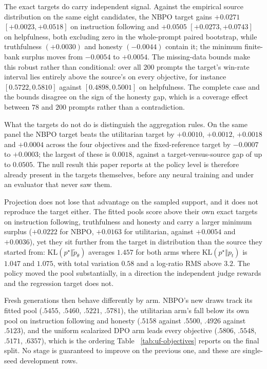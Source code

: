 \documentclass{article}
\makeatletter
\let\revieworiginalref\ref
\newcommand{\reviewref}[1]{%
  \@ifundefined{r@#1}{\textnormal{[original-draft ref.: \texttt{\detokenize{#1}}]}}%
  {\revieworiginalref{#1}}}
\let\ref\reviewref
\theoremstyle{remark}
\theoremstyle{plain}
\newcommand{\KL}{\mathrm{KL}}
\newcommand{\NBPO}{\textsc{NBPO}}
\makeatother
\begin{document}
The exact targets do carry independent signal. Against the empirical source distribution on the
same eight candidates, the \NBPO{} target gains $+0.0271$ $[+0.0023,+0.0518]$ on instruction
following and $+0.0505$ $[+0.0273,+0.0743]$ on helpfulness, both excluding zero in the
whole-prompt paired bootstrap, while truthfulness $(+0.0030)$ and honesty $(-0.0044)$ contain it;
the minimum finite-bank surplus moves from $-0.0054$ to $+0.0054$. The missing-data bounds make
this robust rather than conditional: over all $200$ prompts the target's win-rate interval lies
entirely above the source's on every objective, for instance $[0.5722,0.5810]$ against
$[0.4898,0.5001]$ on helpfulness. The complete case and the bounds disagree on the sign of the
honesty gap, which is a coverage effect between $78$ and $200$ prompts rather than a contradiction.

What the targets do not do is distinguish the aggregation rules. On the same panel the \NBPO{}
target beats the utilitarian target by $+0.0010$, $+0.0012$, $+0.0018$ and $+0.0004$ across the
four objectives and the fixed-reference target by $-0.0007$ to $+0.0003$; the largest of these is
$0.0018$, against a target-versus-source gap of up to $0.0505$. The null result this paper reports
at the policy level is therefore already present in the targets themselves, before any neural
training and under an evaluator that never saw them.

Projection does not lose that advantage on the sampled support, and it does not reproduce the
target either. The fitted pools score above their own exact targets on instruction following,
truthfulness and honesty and carry a larger minimum surplus ($+0.0222$ for \NBPO{}, $+0.0163$ for
utilitarian, against $+0.0054$ and $+0.0036$), yet they sit further from the target in
distribution than the source they started from: $\KL(p^\star\Vert\widetilde p_\theta)$ averages
$1.457$ for both arms where $\KL(p^\star\Vert p_t)$ is $1.047$ and $1.075$, with total variation
$0.58$ and a log-ratio RMS above $3.2$. The policy moved the pool substantially, in a direction
the independent judge rewards and the regression target does not.

Fresh generations then behave differently by arm. \NBPO{}'s new draws track its fitted pool
($.5455$, $.5460$, $.5221$, $.5781$), the utilitarian arm's fall below its own pool on
instruction following and honesty ($.5158$ against $.5500$, $.4926$ against $.5123$), and the
uniform scalarized DPO arm leads every objective ($.5806$, $.5548$, $.5171$, $.6357$), which is
the ordering Table~\ref{tab:uf-objectives} reports on the final split. No stage is guaranteed to
improve on the previous one, and these are single-seed development rows.
\end{document}
